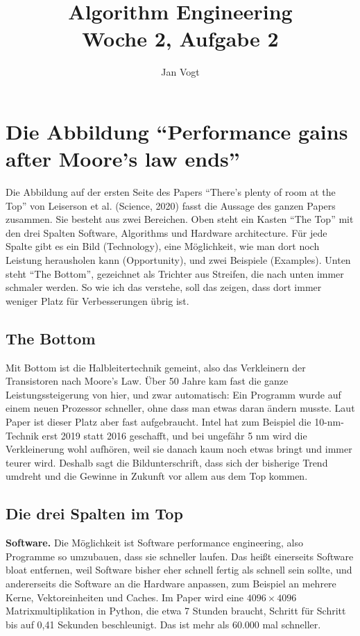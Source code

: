 \documentclass[11pt]{article}
\title{Algorithm Engineering\\Woche 2, Aufgabe 2}
\author{Jan Vogt}
\date{}
\begin{document}
\maketitle

\section*{Die Abbildung "`Performance gains after Moore's law ends"'}

Die Abbildung auf der ersten Seite des Papers "`There's plenty of room at the Top"' von Leiserson
et al. (Science, 2020) fasst die Aussage des ganzen Papers zusammen. Sie besteht aus zwei
Bereichen. Oben steht ein Kasten "`The Top"' mit den drei Spalten Software, Algorithms und
Hardware architecture. Für jede Spalte gibt es ein Bild (Technology), eine Möglichkeit, wie man
dort noch Leistung herausholen kann (Opportunity), und zwei Beispiele (Examples). Unten steht
"`The Bottom"', gezeichnet als Trichter aus Streifen, die nach unten immer schmaler werden. So wie
ich das verstehe, soll das zeigen, dass dort immer weniger Platz für Verbesserungen übrig ist.

\subsection*{The Bottom}

Mit Bottom ist die Halbleitertechnik gemeint, also das Verkleinern der Transistoren nach Moore's
Law. Über 50 Jahre kam fast die ganze Leistungssteigerung von hier, und zwar automatisch: Ein
Programm wurde auf einem neuen Prozessor schneller, ohne dass man etwas daran ändern musste. Laut
Paper ist dieser Platz aber fast aufgebraucht. Intel hat zum Beispiel die 10-nm-Technik erst 2019
statt 2016 geschafft, und bei ungefähr 5 nm wird die Verkleinerung wohl aufhören, weil sie danach
kaum noch etwas bringt und immer teurer wird. Deshalb sagt die Bildunterschrift, dass sich der
bisherige Trend umdreht und die Gewinne in Zukunft vor allem aus dem Top kommen.

\subsection*{Die drei Spalten im Top}

\textbf{Software.} Die Möglichkeit ist Software performance engineering, also Programme so
umzubauen, dass sie schneller laufen. Das heißt einerseits Software bloat entfernen, weil Software
bisher eher schnell fertig als schnell sein sollte, und andererseits die Software an die Hardware
anpassen, zum Beispiel an mehrere Kerne, Vektoreinheiten und Caches. Im Paper wird eine
$4096 \times 4096$ Matrixmultiplikation in Python, die etwa 7 Stunden braucht, Schritt für Schritt
bis auf 0,41 Sekunden beschleunigt. Das ist mehr als 60.000 mal schneller.
\end{document}

